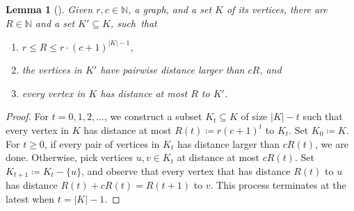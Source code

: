 \documentclass[11pt]{article}
\newcommand{\eqdef}{\coloneqq}
\newtheorem{lemma}[theorem]{Lemma}
\theoremstyle{remark}
\def\N{\mathbb N}
\renewcommand{\le}{\leqslant}
\renewcommand{\ge}{\geqslant}
\begin{document}
\begin{lemma}[{\cite{learningLogic}}]\label{lem:vitali}
    Given $r,c\in\N$, a graph, and a set $K$ of its vertices, there are $R\in\N$ and a set \(K' \subseteq K\),
     such~that
    \begin{enumerate}
        \item $r\le R\le r\cdot (c+1)^{|K|-1}$,
        \item the vertices in \(K'\) have pairwise distance larger than \(c R\), and
        \item every vertex in \(K\) has distance at most \(R\) to \(K'\).
    \end{enumerate}
\end{lemma}
\begin{proof}
For  \(t=0,1,2,\ldots\), we construct a subset \( K_t \subseteq K \) of size \(|K|-t\)
such that every vertex in \(K\) has distance at most \(R(t)\eqdef  r (c + 1)^{t} \) to \(K_t\).
Set \(K_0 \eqdef  K\).
For $t\ge 0$, if every pair of vertices in \(K_t\) has distance larger than \(c R(t)\), we are done.
Otherwise, pick vertices \(u,v \in K_t\) at distance at most \(c R(t)\).
Set \(K_{t+1} \eqdef  K_t - \{u\}\),
and observe that every vertex that has distance \(R(t)\) to \(u\) has distance \(R(t) + c R(t) = R(t+1)\) to \(v\).
This process terminates at the latest when \(t=|K|-1\).
\end{proof}
\end{document}
